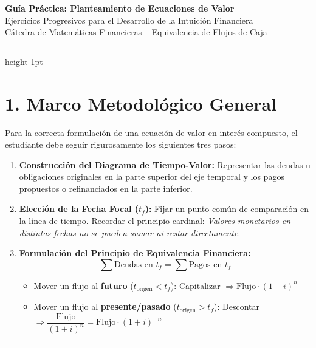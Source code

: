 \documentclass[11pt, a4paper]{article}
\begin{document}
\begin{center}

{\huge \textbf{\color{primary} Guía Práctica: Planteamiento de Ecuaciones de Valor}}\\[6pt privileges]
{\large \color{secondary} Ejercicios Progresivos para el Desarrollo de la Intuición Financiera}\\[4pt]
\small \color{darkgray} Cátedra de Matemáticas Financieras -- Equivalencia de Flujos de Caja
\end{center}

\vspace{0.2cm}
\hrule height 1pt
\vspace{0.4cm}

\section*{\color{primary} 1. Marco Metodológico General}

Para la correcta formulación de una ecuación de valor en interés compuesto, el estudiante debe seguir rigurosamente los siguientes tres pasos:
\begin{enumerate}[leftmargin=*, label=\bfseries Paso \arabic*:]
    \item \textbf{Construcción del Diagrama de Tiempo-Valor:} Representar las deudas u obligaciones originales en la parte superior del eje temporal y los pagos propuestos o refinanciados en la parte inferior.
    \item \textbf{Elección de la Fecha Focal ($t_f$):} Fijar un punto común de comparación en la línea de tiempo. Recordar el principio cardinal: \textit{Valores monetarios en distintas fechas no se pueden sumar ni restar directamente}.
    \item \textbf{Formulación del Principio de Equivalencia Financiera:}
    \[
    \sum \text{Deudas en } t_f = \sum \text{Pagos en } t_f
    \]
    \begin{itemize}[label=$\rightarrow$]
        \item Mover un flujo al \textbf{futuro} ($t_{\text{origen}} < t_f$): Capitalizar $\Rightarrow \text{Flujo} \cdot (1 + i)^n$
        \item Mover un flujo al \textbf{presente/pasado} ($t_{\text{origen}} > t_f$): Descontar $\Rightarrow \dfrac{\text{Flujo}}{(1 + i)^n} = \text{Flujo} \cdot (1 + i)^{-n}$
    \end{itemize}
\end{enumerate}

\vspace{0.3cm}
\hrule
\vspace{0.3cm}
\end{document}
